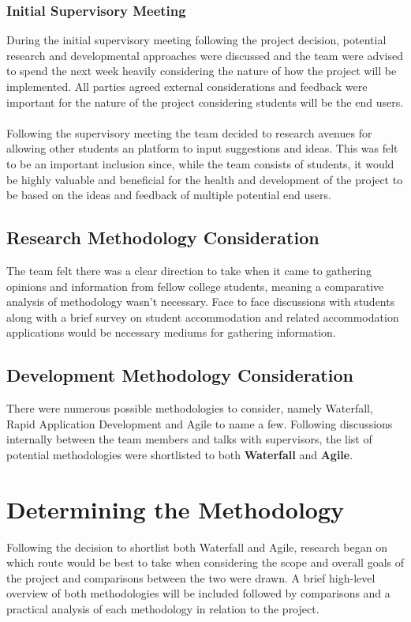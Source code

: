 \subsubsection{Initial Supervisory Meeting}
During the initial supervisory meeting following the project decision, potential research and developmental approaches were discussed and the team were advised to spend the next week heavily considering the nature of how the project will be implemented. All parties agreed external considerations and feedback were important for the nature of the project considering students will be the end users. 

\paragraph{}
Following the supervisory meeting the team decided to research avenues for allowing other students an platform to input suggestions and ideas. This was felt to be an important inclusion since, while the team consists of students, it would be highly valuable and beneficial for the health and development of the project to be based on the ideas and feedback of multiple potential end users.

\subsection{Research Methodology Consideration}
The team felt there was a clear direction to take when it came to gathering opinions and information from fellow college students, meaning a comparative analysis of methodology wasn't necessary. Face to face discussions with students along with a brief survey on student accommodation and related accommodation applications would be necessary mediums for gathering information.

\subsection{Development Methodology Consideration}
There were numerous possible methodologies to consider, namely Waterfall, Rapid Application Development and Agile to name a few. Following discussions internally between the team members and talks with supervisors, the list of potential methodologies were shortlisted to both \textbf{Waterfall} and \textbf{Agile}.

\section{Determining the Methodology}
Following the decision to shortlist both Waterfall and Agile, research began on which route would be best to take when considering the scope and overall goals of the project and comparisons between the two were drawn. A brief high-level overview of both methodologies will be included followed by comparisons and a practical analysis of each methodology in relation to the project.

